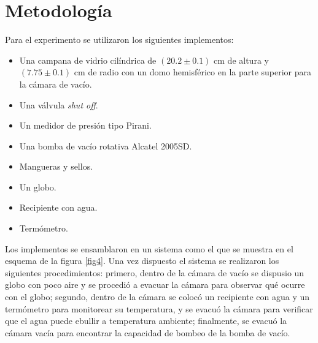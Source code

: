 \documentclass[final,5p,times,twocolumn, nopreprintline]{elsarticle}
\numberwithin{equation}{section}
\begin{document}

\section{Metodología}

Para el experimento se utilizaron los siguientes implementos:

\begin{itemize}
\item Una campana de vidrio cilíndrica de $(20.2\pm0.1)$ cm de altura y $(7.75\pm0.1)$ cm de radio con un domo hemisférico en la parte superior para la cámara de vacío.
\item Una válvula \emph{shut off}.
\item Un medidor de presión tipo Pirani.
\item Una bomba de vacío rotativa Alcatel 2005SD.
\item Mangueras y sellos.
\item Un globo.
\item Recipiente con agua.
\item Termómetro.
\end{itemize}

Los implementos se ensamblaron en un sistema como el que se muestra en el esquema de la figura \ref{fig4}. Una vez dispuesto el sistema se realizaron los siguientes procedimientos: primero, dentro de la cámara de vacío se dispusio un globo con poco aire y se procedió a evacuar la cámara para observar qué ocurre con el globo; segundo, dentro de la cámara se colocó un recipiente con agua y un termómetro para monitorear su temperatura, y se evacuó la cámara para verificar que el agua puede ebullir a temperatura ambiente; finalmente, se evacuó la cámara vacía para encontrar la capacidad de bombeo de la bomba de vacío.

\end{document}
